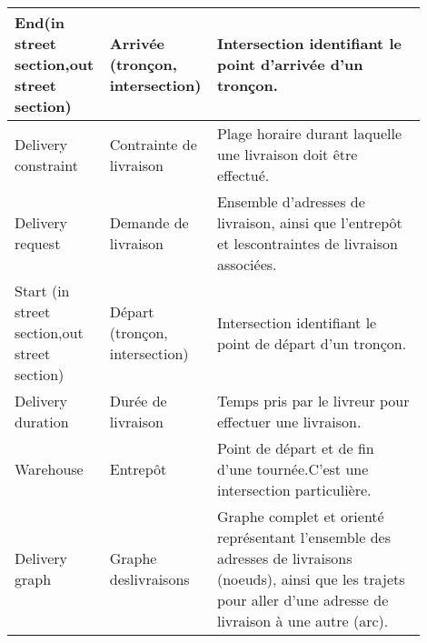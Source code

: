\begin{longtable}{|p{0.2\linewidth}|p{0.2\linewidth}|p{0.5\linewidth}|}
\hline
End(in street section,out street section)   & Arrivée (tronçon, intersection) & Intersection identifiant le point d'arrivée d'un tronçon.                                                                                                                                                                                                                           \\ \hline
Delivery constraint                         & Contrainte de livraison         & Plage horaire durant laquelle une livraison doit être effectué.                                                                                                                                                                                                                     \\ \hline
Delivery request                            & Demande de livraison            & Ensemble d'adresses de livraison, ainsi que l'entrepôt et lescontraintes de livraison associées.                                                                                                                                                                                    \\ \hline
Start (in street section,out street section) & Départ (tronçon, intersection)  & Intersection identifiant le point de départ d'un tronçon.                                                                                                                                                                                                                           \\ \hline
Delivery duration                           & Durée de livraison             & Temps pris par le livreur pour effectuer une livraison.                                                                                                                                                                                                                             \\ \hline
Warehouse                                   & Entrepôt                       & Point de départ et de fin d'une tournée.C'est une intersection particulière.                                                                                                                                                                                                        \\ \hline
Delivery graph                              & Graphe deslivraisons           & Graphe complet et orienté représentant l'ensemble des adresses de livraisons (noeuds), ainsi que les trajets pour aller d'une adresse de livraison à une autre (arc).                                                                                                                \\ \hline

\end{longtable}
